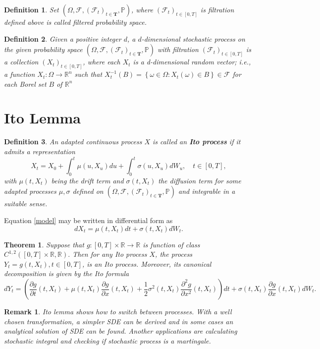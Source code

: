 \documentclass{book}
\newtheorem{definition}{Definition}[section]
\newtheorem{theorem}{Theorem}[section]
\newtheorem{remark}{Remark}[section]
\begin{document}
\begin{definition}
Set $(\varOmega,\mathcal{F},(\mathcal{F}_{t})_{t\in\mathbf{T}},\mathbb{P})$, where $(\mathcal{F}_{t})_{t\in[0,T]}$ is filtration defined above is called filtered probability space.
\end{definition}
\begin{definition}
Given a positive integer $d$, a $d$-dimensional stochastic process on the given probability space $(\varOmega,\mathcal{F},(\mathcal{F}_{t})_{t\in\mathbf{T}},\mathbb{P})$ with filtration $(\mathcal{F}_{t})_{t\in[0,T]}$ is a collection $(X_{t})_{t\in[0,T]}$, where each $X_{t}$ is a d-dimensional random vector; i.e., a function $X_{t}\colon\varOmega\to\mathbb{R}^{n}$ such that $X_{t}^{-1}(B)=\left\{\omega\in\varOmega\colon X_{t}(\omega)\in B\right\}\in\mathcal{F}$ for each Borel set $B$ of $\mathbb{R}^{n}$
\end{definition}
\section{Ito Lemma}
\begin{definition}
An adapted continuous process $X$ is called an \textbf{Ito process} if it admits a representation
\begin{equation}
\label{model}
X_{t}=X_{0}+\int_{0}^{t}\mu(u,X_{u}) du+\int_{0}^{t}\sigma(u,X_{u}) dW_{u},\quad t\in[0,T],
\end{equation}
with $\mu(t,X_{t})$ being the drift term and $\sigma(t,X_{t})$ the diffusion term for some adapted processes $\mu,\sigma$ defined on $(\varOmega,\mathcal{F},(\mathcal{F}_{t})_{t\in\mathbf{T}},\mathbb{P})$ and integrable in a suitable sense.
\end{definition}
Equation \eqref{model} may be written in differential form as
$$
dX_{t}=\mu(t,X_{t})dt+\sigma(t,X_{t})dW_{t}.
$$
\begin{theorem}
Suppose that $g\colon[0,T]\times\mathbb{R}\to\mathbb{R}$ is function of class $C^{1,2}([0,T]\times\mathbb{R},\mathbb{R}).$ Then for any Ito process $X$, the process $Y_{t}=g(t,X_{t}),t\in[0,T]$, is an Ito process. Moreover, its canonical decomposition is given by the Ito formula
$$
dY_{t}=\left(\frac{\partial g}{\partial t}(t,X_{t})+\mu(t,X_{t})\frac{\partial g}{\partial x}(t,X_{t})+\frac{1}{2}\sigma^{2}(t,X_{t})\frac{\partial^{2} g}{\partial x^{2}}(t, X_{t})\right)dt+\sigma(t,X_{t})\frac{\partial g}{\partial x}(t,X_{t})dW_{t}.
$$  
\end{theorem}
\begin{remark}
Ito lemma shows how to switch between processes. With a well chosen transformation, a simpler SDE can be derived and in some cases an analytical solution of SDE can be found. Another applications are calculating stochastic integral and checking if stochastic process is a martingale.
\end{remark}
\end{document}
